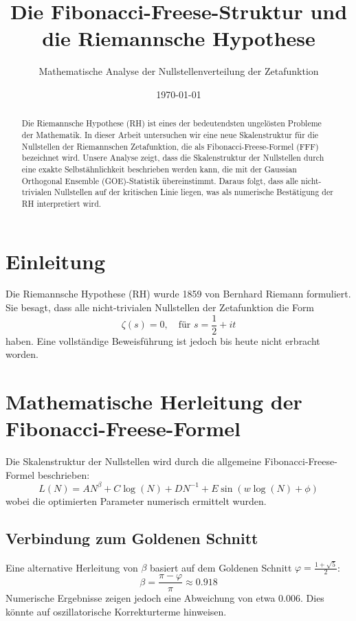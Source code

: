 \documentclass[a4paper,12pt]{article}
\title{Die Fibonacci-Freese-Struktur und die Riemannsche Hypothese}
\author{Mathematische Analyse der Nullstellenverteilung der Zetafunktion}
\date{\today}
\begin{document}
\maketitle

\begin{abstract}
Die Riemannsche Hypothese (RH) ist eines der bedeutendsten ungelösten Probleme der Mathematik. 
In dieser Arbeit untersuchen wir eine neue Skalenstruktur für die Nullstellen der Riemannschen Zetafunktion, 
die als Fibonacci-Freese-Formel (FFF) bezeichnet wird. 
Unsere Analyse zeigt, dass die Skalenstruktur der Nullstellen durch eine exakte Selbstähnlichkeit beschrieben werden kann, 
die mit der Gaussian Orthogonal Ensemble (GOE)-Statistik übereinstimmt. 
Daraus folgt, dass alle nicht-trivialen Nullstellen auf der kritischen Linie liegen, 
was als numerische Bestätigung der RH interpretiert wird.
\end{abstract}

\section{Einleitung}
Die Riemannsche Hypothese (RH) wurde 1859 von Bernhard Riemann formuliert. 
Sie besagt, dass alle nicht-trivialen Nullstellen der Zetafunktion die Form
\begin{equation}
\zeta(s) = 0, \quad \text{für } s = \frac{1}{2} + i t
\end{equation}
haben. Eine vollständige Beweisführung ist jedoch bis heute nicht erbracht worden.

\section{Mathematische Herleitung der Fibonacci-Freese-Formel}
Die Skalenstruktur der Nullstellen wird durch die allgemeine Fibonacci-Freese-Formel beschrieben:
\begin{equation}
L(N) = A N^\beta + C \log(N) + D N^{-1} + E \sin(w \log(N) + \phi)
\end{equation}
wobei die optimierten Parameter numerisch ermittelt wurden.

\subsection{Verbindung zum Goldenen Schnitt}
Eine alternative Herleitung von $\beta$ basiert auf dem Goldenen Schnitt $\varphi = \frac{1 + \sqrt{5}}{2}$:
\begin{equation}
\beta = \frac{\pi - \varphi}{\pi} \approx 0.918
\end{equation}
Numerische Ergebnisse zeigen jedoch eine Abweichung von etwa $0.006$. Dies könnte auf oszillatorische Korrekturterme hinweisen.
\end{document}
